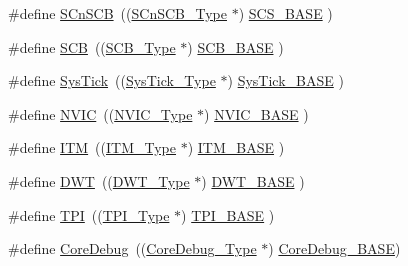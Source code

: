 \begin{DoxyCompactItemize}
\item 
\#define \hyperlink{group___c_m_s_i_s__core__base_ga9fe0cd2eef83a8adad94490d9ecca63f}{S\-Cn\-S\-C\-B}~((\hyperlink{struct_s_cn_s_c_b___type}{S\-Cn\-S\-C\-B\-\_\-\-Type}    $\ast$)     \hyperlink{group___c_m_s_i_s__core__base_ga3c14ed93192c8d9143322bbf77ebf770}{S\-C\-S\-\_\-\-B\-A\-S\-E}      )
\item 
\#define \hyperlink{group___c_m_s_i_s__core__base_gaaaf6477c2bde2f00f99e3c2fd1060b01}{S\-C\-B}~((\hyperlink{struct_s_c_b___type}{S\-C\-B\-\_\-\-Type}       $\ast$)     \hyperlink{group___c_m_s_i_s__core__base_gad55a7ddb8d4b2398b0c1cfec76c0d9fd}{S\-C\-B\-\_\-\-B\-A\-S\-E}      )
\item 
\#define \hyperlink{group___c_m_s_i_s__core__base_gacd96c53beeaff8f603fcda425eb295de}{Sys\-Tick}~((\hyperlink{struct_sys_tick___type}{Sys\-Tick\-\_\-\-Type}   $\ast$)     \hyperlink{group___c_m_s_i_s__core__base_ga58effaac0b93006b756d33209e814646}{Sys\-Tick\-\_\-\-B\-A\-S\-E}  )
\item 
\#define \hyperlink{group___c_m_s_i_s__core__base_gac8e97e8ce56ae9f57da1363a937f8a17}{N\-V\-I\-C}~((\hyperlink{struct_n_v_i_c___type}{N\-V\-I\-C\-\_\-\-Type}      $\ast$)     \hyperlink{group___c_m_s_i_s__core__base_gaa0288691785a5f868238e0468b39523d}{N\-V\-I\-C\-\_\-\-B\-A\-S\-E}     )
\item 
\#define \hyperlink{group___c_m_s_i_s__core__base_gabae7cdf882def602cb787bb039ff6a43}{I\-T\-M}~((\hyperlink{struct_i_t_m___type}{I\-T\-M\-\_\-\-Type}       $\ast$)     \hyperlink{group___c_m_s_i_s__core__base_gadd76251e412a195ec0a8f47227a8359e}{I\-T\-M\-\_\-\-B\-A\-S\-E}      )
\item 
\#define \hyperlink{group___c_m_s_i_s__core__base_gabbe5a060185e1d5afa3f85b14e10a6ce}{D\-W\-T}~((\hyperlink{struct_d_w_t___type}{D\-W\-T\-\_\-\-Type}       $\ast$)     \hyperlink{group___c_m_s_i_s__core__base_gafdab534f961bf8935eb456cb7700dcd2}{D\-W\-T\-\_\-\-B\-A\-S\-E}      )
\item 
\#define \hyperlink{group___c_m_s_i_s__core__base_ga8b4dd00016aed25a0ea54e9a9acd1239}{T\-P\-I}~((\hyperlink{struct_t_p_i___type}{T\-P\-I\-\_\-\-Type}       $\ast$)     \hyperlink{group___c_m_s_i_s__core__base_ga2b1eeff850a7e418844ca847145a1a68}{T\-P\-I\-\_\-\-B\-A\-S\-E}      )
\item 
\#define \hyperlink{group___c_m_s_i_s__core__base_gab6e30a2b802d9021619dbb0be7f5d63d}{Core\-Debug}~((\hyperlink{struct_core_debug___type}{Core\-Debug\-\_\-\-Type} $\ast$)     \hyperlink{group___c_m_s_i_s__core__base_ga680604dbcda9e9b31a1639fcffe5230b}{Core\-Debug\-\_\-\-B\-A\-S\-E})

\end{DoxyCompactItemize}
